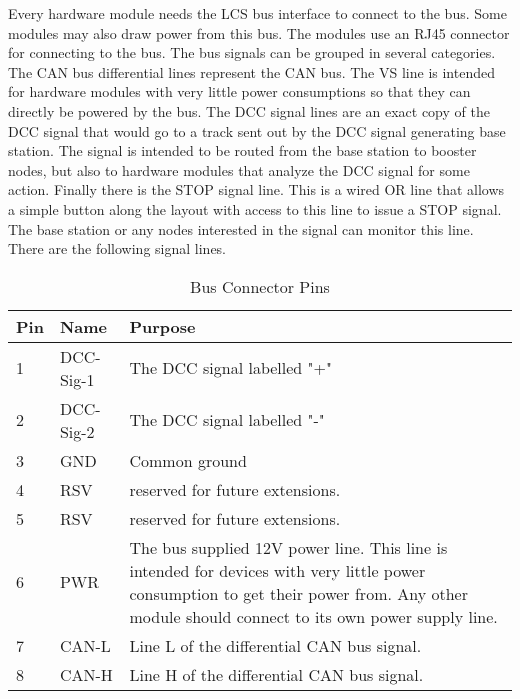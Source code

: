 Every hardware module needs the LCS bus interface to connect to the bus. Some modules may also draw power from this bus. The modules use an RJ45 connector for connecting to the bus. The bus signals can be grouped in several categories. The CAN bus differential lines represent the CAN bus. The VS line is intended for hardware modules with very little power consumptions so that they can directly be powered by the bus. The DCC signal lines are an exact copy of the DCC signal that would go to a track sent out by the DCC signal generating base station. The signal is intended to be routed from the base station to booster nodes, but also to hardware modules that analyze the DCC signal for some action. Finally there is the STOP signal line. This is a wired OR line that allows a simple button along the layout with access to this line to issue a STOP signal. The base station or any nodes interested in the signal can monitor this line. There are the following signal lines.

\begin{table}[!ht]
    \begin{center}
        \caption{Bus Connector Pins}
        \begin{tabular}{|l|l|p{}|}
            \toprule
            \textbf{Pin} & \textbf{Name} & \textbf{Purpose} \\
            \midrule
            1 & DCC-Sig-1 & The DCC signal labelled "+" \\
            \midrule
            2 & DCC-Sig-2 & The DCC signal labelled "-" \\
            \midrule
            3 & GND & Common ground \\
            \midrule
            4 & RSV & reserved for future extensions. \\
            \midrule
            5 & RSV & reserved for future extensions. \\
            \midrule
            6 & PWR & The bus supplied 12V power line. This line is intended for devices with very little power consumption to get their power from. Any other module should connect to its own power supply line. \\
            \midrule
            7 & CAN-L &  Line L of the differential CAN bus signal. \\
            \midrule
            8 & CAN-H &  Line H of the differential CAN bus signal. \\
            \bottomrule
        \end{tabular}
    \end{center}
\end{table}

